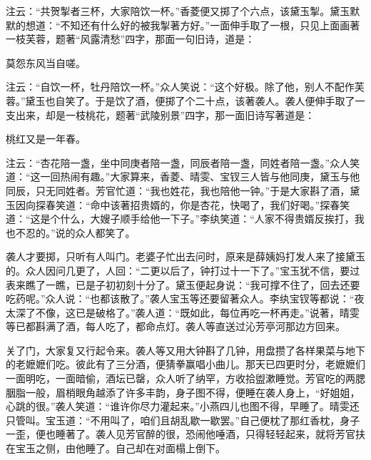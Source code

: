 \begin{parag}
    注云：“共贺掣者三杯，大家陪饮一杯。”香菱便又掷了个六点，该黛玉掣。黛玉默默的想道：“不知还有什么好的被我掣著方好。”一面伸手取了一根，只见上面画著一枝芙蓉，题著“风露清愁”四字，那面一句旧诗，道是：
\end{parag}


\begin{poem}
    \begin{pl}
        莫怨东风当自嗟。
    \end{pl}
\end{poem}


\begin{parag}
    注云：“自饮一杯，牡丹陪饮一杯。”众人笑说：“这个好极。除了他，别人不配作芙蓉。”黛玉也自笑了。于是饮了酒，便掷了个二十点，该著袭人。袭人便伸手取了一支出来，却是一枝桃花，题著“武陵别景”四字，那一面旧诗写著道是：
\end{parag}


\begin{poem}
    \begin{pl}
        桃红又是一年春。
    \end{pl}
\end{poem}


\begin{parag}
    注云：“杏花陪一盏，坐中同庚者陪一盏，同辰者陪一盏，同姓者陪一盏。”众人笑道：“这一回热闹有趣。”大家算来，香菱、晴雯、宝钗三人皆与他同庚，黛玉与他同辰，只无同姓者。芳官忙道：“我也姓花，我也陪他一钟。”于是大家斟了酒，黛玉因向探春笑道：“命中该著招贵婿的，你是杏花，快喝了，我们好喝。”探春笑道：“这是个什么，大嫂子顺手给他一下子。”李纨笑道：“人家不得贵婿反挨打，我也不忍的。”说的众人都笑了。
\end{parag}


\begin{parag}
    袭人才要掷，只听有人叫门。老婆子忙出去问时，原来是薛姨妈打发人来了接黛玉的。众人因问几更了，人回：“二更以后了，钟打过十一下了。”宝玉犹不信，要过表来瞧了一瞧，已是子初初刻十分了。黛玉便起身说：“我可撑不住了，回去还要吃药呢。”众人说：“也都该散了。”袭人宝玉等还要留著众人。李纨宝钗等都说：“夜太深了不像，这已是破格了。”袭人道：“既如此，每位再吃一杯再走。”说著，晴雯等已都斟满了酒，每人吃了，都命点灯。袭人等直送过沁芳亭河那边方回来。
\end{parag}


\begin{parag}
    关了门，大家复又行起令来。袭人等又用大钟斟了几钟，用盘攒了各样果菜与地下的老嬷嬷们吃。彼此有了三分酒，便猜拳赢唱小曲儿。那天已四更时分，老嬷嬷们一面明吃，一面暗偷，酒坛已罄，众人听了纳罕，方收拾盥漱睡觉。芳官吃的两腮胭脂一般，眉梢眼角越添了许多丰韵，身子图不得，便睡在袭人身上，“好姐姐，心跳的很。”袭人笑道：“谁许你尽力灌起来。”小燕四儿也图不得，早睡了。晴雯还只管叫。宝玉道：“不用叫了，咱们且胡乱歇一歇罢。”自己便枕了那红香枕，身子一歪，便也睡著了。袭人见芳官醉的很，恐闹他唾酒，只得轻轻起来，就将芳官扶在宝玉之侧，由他睡了。自己却在对面榻上倒下。
\end{parag}


